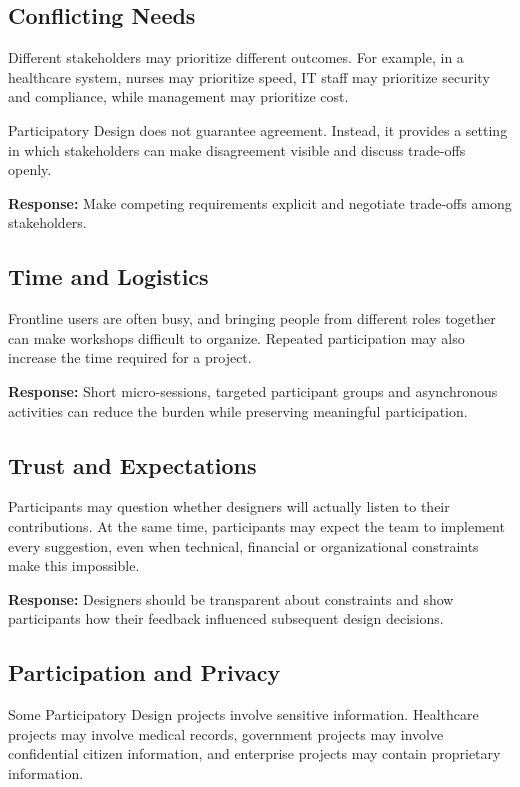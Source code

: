 \documentclass[a4paper,12pt]{article}
\begin{document}
\subsection{Conflicting Needs}

Different stakeholders may prioritize different outcomes. For example, in a
healthcare system, nurses may prioritize speed, IT staff may prioritize
security and compliance, while management may prioritize cost.

Participatory Design does not guarantee agreement. Instead, it provides a
setting in which stakeholders can make disagreement visible and discuss
trade-offs openly.

\textbf{Response:} Make competing requirements explicit and negotiate
trade-offs among stakeholders.


\subsection{Time and Logistics}

Frontline users are often busy, and bringing people from different roles
together can make workshops difficult to organize. Repeated participation
may also increase the time required for a project.

\textbf{Response:} Short micro-sessions, targeted participant groups and
asynchronous activities can reduce the burden while preserving meaningful
participation.


\subsection{Trust and Expectations}

Participants may question whether designers will actually listen to their
contributions. At the same time, participants may expect the team to implement
every suggestion, even when technical, financial or organizational
constraints make this impossible.

\textbf{Response:} Designers should be transparent about constraints and
show participants how their feedback influenced subsequent design decisions.


\subsection{Participation and Privacy}

Some Participatory Design projects involve sensitive information. Healthcare
projects may involve medical records, government projects may involve
confidential citizen information, and enterprise projects may contain
proprietary information.
\end{document}
